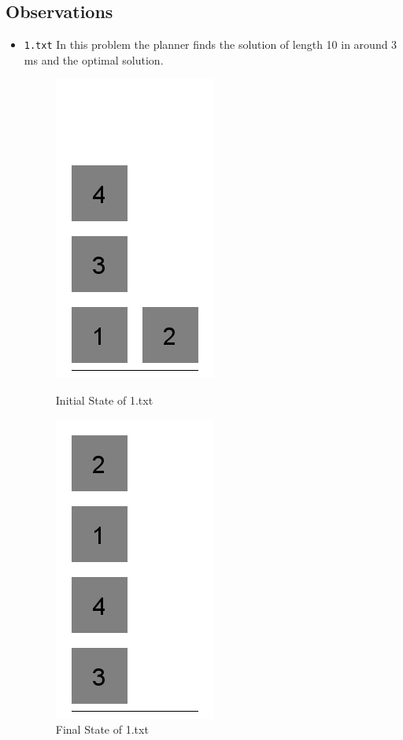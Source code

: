 \documentclass{article}
\begin{document}
\subsection{Observations}
\begin{itemize}
\item \verb|1.txt| In this problem the planner finds the solution of length 10 in around 3 ms and the optimal solution.

\begin{figure}[H]
    \centering
    \begin{minipage}{0.45\textwidth}
        \centering
        \includegraphics[scale=0.3]{1i}
        \caption{Initial State of 1.txt}
    \end{minipage}\hfill
    \begin{minipage}{0.45\textwidth}
        \centering
        \includegraphics[scale=0.3]{1f}
        \caption{Final State of 1.txt}
    \end{minipage}
\end{figure}


\end{itemize}
\end{document}
